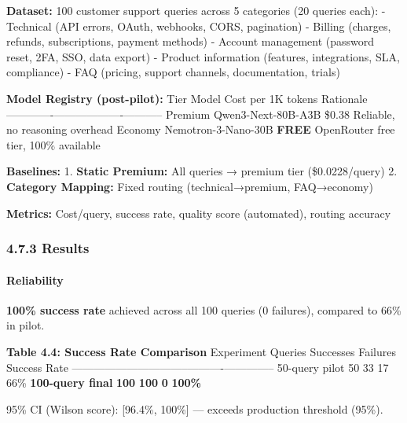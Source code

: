 \documentclass[
  11pt,
]{article}
\begin{document}
\textbf{Dataset:} 100 customer support queries across 5 categories (20
queries each): - Technical (API errors, OAuth, webhooks, CORS,
pagination) - Billing (charges, refunds, subscriptions, payment methods)
- Account management (password reset, 2FA, SSO, data export) - Product
information (features, integrations, SLA, compliance) - FAQ (pricing,
support channels, documentation, trials)

\textbf{Model Registry (post-pilot):} \textbar{} Tier \textbar{} Model
\textbar{} Cost per 1K tokens \textbar{} Rationale \textbar{}
\textbar------\textbar-------\textbar-------------------\textbar-----------\textbar{}
\textbar{} Premium \textbar{} Qwen3-Next-80B-A3B \textbar{} \$0.38
\textbar{} Reliable, no reasoning overhead \textbar{} \textbar{} Economy
\textbar{} Nemotron-3-Nano-30B \textbar{} \textbf{FREE} \textbar{}
OpenRouter free tier, 100\% available \textbar{}

\textbf{Baselines:} 1. \textbf{Static Premium:} All queries → premium
tier (\$0.0228/query) 2. \textbf{Category Mapping:} Fixed routing
(technical→premium, FAQ→economy)

\textbf{Metrics:} Cost/query, success rate, quality score (automated),
routing accuracy

\hypertarget{results-2}{%
\subsubsection{4.7.3 Results}\label{results-2}}

\hypertarget{reliability}{%
\paragraph{Reliability}\label{reliability}}

\textbf{100\% success rate} achieved across all 100 queries (0
failures), compared to 66\% in pilot.

\textbf{Table 4.4: Success Rate Comparison} \textbar{} Experiment
\textbar{} Queries \textbar{} Successes \textbar{} Failures \textbar{}
Success Rate \textbar{}
\textbar------------\textbar---------\textbar-----------\textbar----------\textbar--------------\textbar{}
\textbar{} 50-query pilot \textbar{} 50 \textbar{} 33 \textbar{} 17
\textbar{} 66\% \textbar{} \textbar{} \textbf{100-query final}
\textbar{} \textbf{100} \textbar{} \textbf{100} \textbar{} \textbf{0}
\textbar{} \textbf{100\%} \textbar{}

95\% CI (Wilson score): {[}96.4\%, 100\%{]} --- exceeds production
threshold (95\%).
\end{document}

